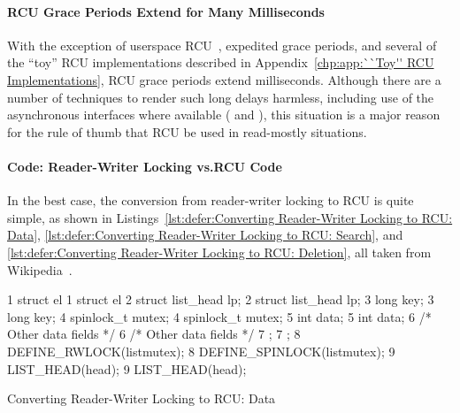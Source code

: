 \paragraph{RCU Grace Periods Extend for Many Milliseconds}

With the exception of userspace
RCU~\cite{MathieuDesnoyers2009URCU,PaulMcKenney2013LWNURCU},
expedited grace periods, and several of the ``toy''
RCU implementations described in
Appendix~\ref{chp:app:``Toy'' RCU Implementations},
RCU grace periods extend milliseconds.
Although there are a number of techniques to render such long delays
harmless, including use of the asynchronous interfaces where available
( and ), this situation
is a major reason for the rule of thumb that RCU be used in read-mostly
situations.

\paragraph{Code: Reader-Writer Locking vs.\@ RCU Code}

In the best case, the conversion from reader-writer locking to RCU
is quite simple, as shown in
Listings~\ref{lst:defer:Converting Reader-Writer Locking to RCU: Data},
\ref{lst:defer:Converting Reader-Writer Locking to RCU: Search},
and
\ref{lst:defer:Converting Reader-Writer Locking to RCU: Deletion},
all taken from
Wikipedia~\cite{WikipediaRCU}.

\begin{listing*}[htbp]
{ \scriptsize
\begin{verbbox}
 1 struct el {                           1 struct el {
 2   struct list_head lp;                2   struct list_head lp;
 3   long key;                           3   long key;
 4   spinlock_t mutex;                   4   spinlock_t mutex;
 5   int data;                           5   int data;
 6   /* Other data fields */             6   /* Other data fields */
 7 };                                    7 };
 8 DEFINE_RWLOCK(listmutex);             8 DEFINE_SPINLOCK(listmutex);
 9 LIST_HEAD(head);                      9 LIST_HEAD(head);
\end{verbbox}
}
\hspace*{0.9in}\OneColumnHSpace{-0.5in}
\IfEbookSize{\hspace*{-1.05in}}{}\theverbbox
\caption{Converting Reader-Writer Locking to RCU: Data}
\label{lst:defer:Converting Reader-Writer Locking to RCU: Data}
\end{listing*}

